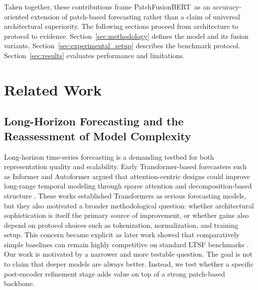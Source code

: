 \documentclass{ieeeaccess}
\newcommand{\model}{PatchFusionBERT\xspace}
\begin{document}
Taken together, these contributions frame \model\ as an accuracy-oriented extension
of patch-based forecasting rather than a claim of universal architectural superiority.
The following sections proceed from architecture to protocol to evidence.
Section~\ref{sec:methodology} defines the model and its fusion variants.
Section~\ref{sec:experimental_setup} describes the benchmark protocol.
Section~\ref{sec:results} evaluates performance and limitations.

\section{Related Work}\label{sec:related}

\subsection{Long-Horizon Forecasting and the Reassessment of Model Complexity}
Long-horizon time-series forecasting is a demanding testbed for both representation
quality and scalability. Early Transformer-based forecasters such as Informer and
Autoformer argued that attention-centric designs could improve long-range temporal
modeling through sparse attention and decomposition-based structure
\cite{zhou2021informer,wu2021autoformer}. These works established Transformers as
serious forecasting models, but they also motivated a broader methodological question:
whether architectural sophistication is itself the primary source of improvement, or
whether gains also depend on protocol choices such as tokenization, normalization, and
training setup. This concern became explicit as later work showed that comparatively
simple baselines can remain highly competitive on standard LTSF benchmarks
\cite{zeng2023transformers,closerlook2024tsf}. Our work is motivated by a narrower
and more testable question. The goal is not to claim that deeper models are always
better. Instead, we test whether a specific post-encoder refinement stage adds value
on top of a strong patch-based backbone.
\end{document}
